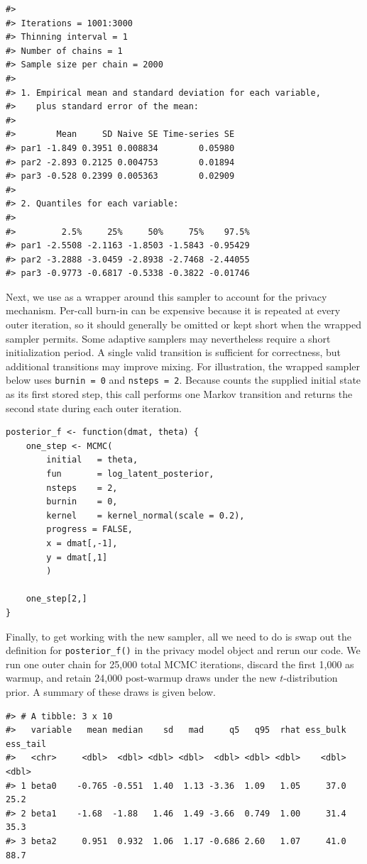 \begin{verbatim}
#> 
#> Iterations = 1001:3000
#> Thinning interval = 1 
#> Number of chains = 1 
#> Sample size per chain = 2000 
#> 
#> 1. Empirical mean and standard deviation for each variable,
#>    plus standard error of the mean:
#> 
#>        Mean     SD Naive SE Time-series SE
#> par1 -1.849 0.3951 0.008834        0.05980
#> par2 -2.893 0.2125 0.004753        0.01894
#> par3 -0.528 0.2399 0.005363        0.02909
#> 
#> 2. Quantiles for each variable:
#> 
#>         2.5%     25%     50%     75%    97.5%
#> par1 -2.5508 -2.1163 -1.8503 -1.5843 -0.95429
#> par2 -3.2888 -3.0459 -2.8938 -2.7468 -2.44055
#> par3 -0.9773 -0.6817 -0.5338 -0.3822 -0.01746
\end{verbatim}

Next, we use  as a wrapper around this sampler to account for
the privacy mechanism. Per-call burn-in can be expensive because it is repeated
at every outer iteration, so it should generally be omitted or kept short when
the wrapped sampler permits. Some adaptive samplers may nevertheless require a
short initialization period. A single valid transition is sufficient for
correctness, but additional transitions may improve mixing. For illustration,
the wrapped sampler below uses \texttt{burnin\ =\ 0} and \texttt{nsteps\ =\ 2}. Because
 counts the supplied initial state as its first stored step, this
call performs one Markov transition and returns the second state during each
outer  iteration.

\begin{verbatim}
posterior_f <- function(dmat, theta) {
    one_step <- MCMC(
        initial   = theta, 
        fun       = log_latent_posterior, 
        nsteps    = 2, 
        burnin    = 0,
        kernel    = kernel_normal(scale = 0.2),
        progress = FALSE,
        x = dmat[,-1],
        y = dmat[,1]
        )
    
    one_step[2,]
}
\end{verbatim}

Finally, to get  working with the new sampler,
all we need to do is swap out the definition for \texttt{posterior\_f()} in the privacy model object
and rerun our code. We run one outer chain for 25,000 total MCMC iterations,
discard the first 1,000 as warmup, and retain 24,000 post-warmup draws under the
new \(t\)-distribution prior. A summary of these draws is given below.

\begin{verbatim}
#> # A tibble: 3 x 10
#>   variable   mean median    sd   mad     q5   q95  rhat ess_bulk ess_tail
#>   <chr>     <dbl>  <dbl> <dbl> <dbl>  <dbl> <dbl> <dbl>    <dbl>    <dbl>
#> 1 beta0    -0.765 -0.551  1.40  1.13 -3.36  1.09   1.05     37.0     25.2
#> 2 beta1    -1.68  -1.88   1.46  1.49 -3.66  0.749  1.00     31.4     35.3
#> 3 beta2     0.951  0.932  1.06  1.17 -0.686 2.60   1.07     41.0     88.7
\end{verbatim}

